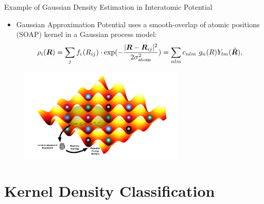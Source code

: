 \documentclass[aspectratio=169]{beamer}
\begin{document}
 \begin{frame}{Example of Gaussian Density Estimation in Interatomic Potential}
    \begin{itemize}
        \item Gaussian Approximation Potential\cite{bartokGaussianApproximationPotentials2010} uses a smooth-overlap of atomic positions (SOAP) kernel in a Gaussian process model:
    \begin{eqnarray*}
        \rho_{i}(\boldsymbol{R}) = \sum_{j} f_{c}(R_{ij}) \cdot \exp(-\frac{|\boldsymbol{R} - \boldsymbol{R}_{ij}|^{2}}{2\sigma_{\rm atom}^{2}}) = \sum_{nlm} c_{nlm} \ g_{n}(R) Y_{lm}(\hat{\boldsymbol{R}}),
    \end{eqnarray*}
    \end{itemize}
    \begin{figure}
        \centering
        \includegraphics[width=0.7\textwidth]{figures/PES.png}
    \end{figure}
\end{frame}


\section{Kernel Density Classification}
\end{document}
